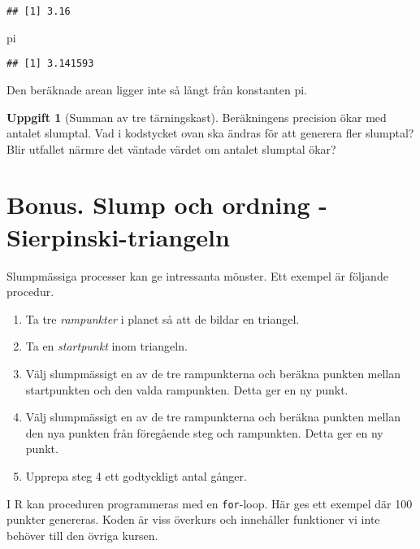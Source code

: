 \documentclass[
]{book}
\newenvironment{Shaded}{\begin{snugshade}}{\end{snugshade}}
\newcommand{\NormalTok}[1]{#1}
\providecommand{\tightlist}{%
  \setlength{\itemsep}{0pt}\setlength{\parskip}{0pt}}
\theoremstyle{definition}
\theoremstyle{definition}
\theoremstyle{definition}
\newtheorem{exercise}{Uppgift}[chapter]
\theoremstyle{definition}
\theoremstyle{remark}
\begin{document}
\begin{verbatim}
## [1] 3.16
\end{verbatim}

\begin{Shaded}
\begin{Highlighting}[]
\NormalTok{pi}
\end{Highlighting}
\end{Shaded}

\begin{verbatim}
## [1] 3.141593
\end{verbatim}

Den beräknade arean ligger inte så långt från konstanten pi.

\begin{exercise}[Summan av tre tärningskast]
Beräkningens precision ökar med antalet slumptal. Vad i kodstycket ovan ska ändras för att generera fler slumptal? Blir utfallet närmre det väntade värdet om antalet slumptal ökar?
\end{exercise}

\hypertarget{bonus.-slump-och-ordning---sierpinski-triangeln}{%
\section{Bonus. Slump och ordning - Sierpinski-triangeln}\label{bonus.-slump-och-ordning---sierpinski-triangeln}}

Slumpmässiga processer kan ge intressanta mönster. Ett exempel är följande procedur.

\begin{enumerate}
\def\labelenumi{\arabic{enumi}.}
\tightlist
\item
  Ta tre \emph{rampunkter} i planet så att de bildar en triangel.
\item
  Ta en \emph{startpunkt} inom triangeln.
\item
  Välj slumpmässigt en av de tre rampunkterna och beräkna punkten mellan startpunkten och den valda rampunkten. Detta ger en ny punkt.
\item
  Välj slumpmässigt en av de tre rampunkterna och beräkna punkten mellan den nya punkten från föregående steg och rampunkten. Detta ger en ny punkt.
\item
  Upprepa steg 4 ett godtyckligt antal gånger.
\end{enumerate}

I R kan proceduren programmeras med en \texttt{for}-loop. Här ges ett exempel där 100 punkter genereras. Koden är viss överkurs och innehåller funktioner vi inte behöver till den övriga kursen.
\end{document}
